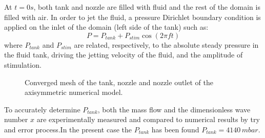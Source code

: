\documentclass[twocolumn,10pt]{asme2ej}
\begin{document}
At $t=0s$, both tank and nozzle are filled with fluid and the rest of the domain is filled with air. In order to jet the fluid, a pressure Dirichlet boundary condition is applied on the inlet of the domain (left side of the tank) such as:
\begin{equation} \label{eq:plim}
    P=P_{tank}+P_{stim}\cos(2\pi f t)
\end{equation}
where $P_{tank}$ and $P_{stim}$ are related, respectively, to the absolute steady pressure in the fluid tank, driving the jetting velocity of the fluid, and the amplitude of stimulation.
\begin{figure}[H]
    \centering    
    \caption{Converged mesh of the tank, nozzle and nozzle outlet of the axisymmetric numerical model.} 
    \label{fig:meshGlycerol}
\end{figure}

To accurately determine $P_{tank}$, both the mass flow and the dimensionless wave number $x$ are experimentally measured and compared to numerical results by try and error process.In the present case the $P_{tank}$ has been found $P_{tank}=4140 \, mbar$. 
\end{document}
